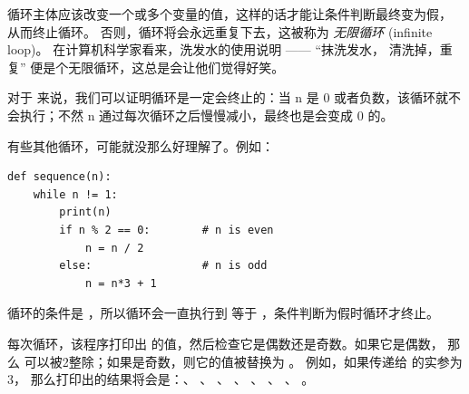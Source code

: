   

循环主体应该改变一个或多个变量的值，这样的话才能让条件判断最终变为假，
从而终止循环。 否则，循环将会永远重复下去，这被称为 {\em 无限循环} (infinite loop)。 在计算机科学家看来，洗发水的使用说明 —— ``抹洗发水，
清洗掉，重复'' 便是个无限循环，这总是会让他们觉得好笑。
  


对于  来说，我们可以证明循环是一定会终止的：当 n 是 0 或者负数，该循环就不会执行；不然 n 通过每次循环之后慢慢减小，最终也是会变成 0 的。


有些其他循环，可能就没那么好理解了。例如：

\begin{lstlisting}
def sequence(n):
    while n != 1:
        print(n)
        if n % 2 == 0:        # n is even
            n = n / 2
        else:                 # n is odd
            n = n*3 + 1
\end{lstlisting}

%

循环的条件是 ，所以循环会一直执行到  等于 ，条件判断为假时循环才终止。


每次循环，该程序打印出  的值，然后检查它是偶数还是奇数。如果它是偶数，
那么  可以被2整除；如果是奇数，则它的值被替换为 。 例如，如果传递给  的实参为3， 那么打印出的结果将会是：、 、 、 、 、 、 、 。

